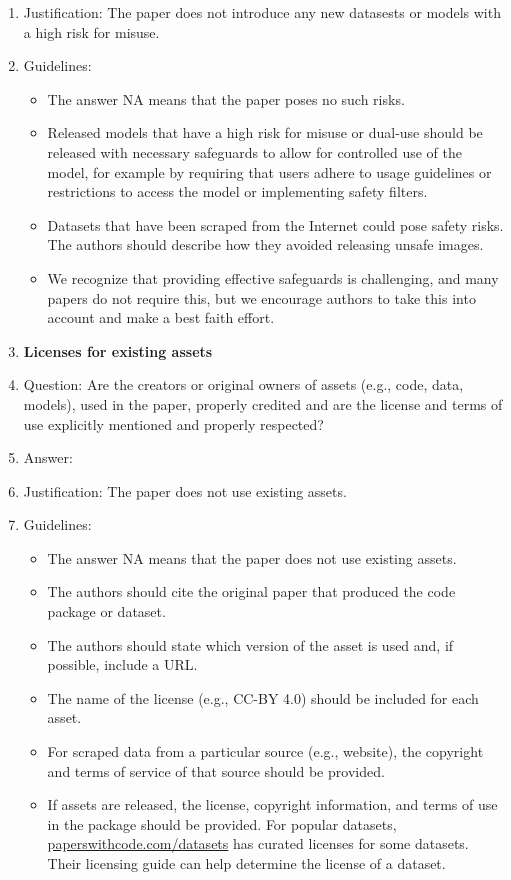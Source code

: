 \documentclass{article}
\begin{document}
\begin{enumerate}
    \item[] Justification: The paper does not introduce any new datasests or models with a high risk for misuse.
    \item[] Guidelines:
    \begin{itemize}
        \item The answer NA means that the paper poses no such risks.
        \item Released models that have a high risk for misuse or dual-use should be released with necessary safeguards to allow for controlled use of the model, for example by requiring that users adhere to usage guidelines or restrictions to access the model or implementing safety filters.
        \item Datasets that have been scraped from the Internet could pose safety risks. The authors should describe how they avoided releasing unsafe images.
        \item We recognize that providing effective safeguards is challenging, and many papers do not require this, but we encourage authors to take this into account and make a best faith effort.
    \end{itemize}
\item {\bf Licenses for existing assets}
    \item[] Question: Are the creators or original owners of assets (e.g., code, data, models), used in the paper, properly credited and are the license and terms of use explicitly mentioned and properly respected?
    \item[] Answer: \answerNA{}
    \item[] Justification: The paper does not use existing assets.
    \item[] Guidelines:
    \begin{itemize}
        \item The answer NA means that the paper does not use existing assets.
        \item The authors should cite the original paper that produced the code package or dataset.
        \item The authors should state which version of the asset is used and, if possible, include a URL.
        \item The name of the license (e.g., CC-BY 4.0) should be included for each asset.
        \item For scraped data from a particular source (e.g., website), the copyright and terms of service of that source should be provided.
        \item If assets are released, the license, copyright information, and terms of use in the package should be provided. For popular datasets, \url{paperswithcode.com/datasets} has curated licenses for some datasets. Their licensing guide can help determine the license of a dataset.

\end{itemize}
\end{enumerate}
\end{document}
